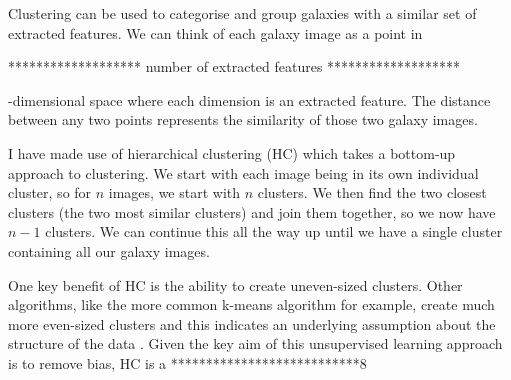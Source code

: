 \documentclass[12pt, onecolumn]{article}
\begin{document}
        Clustering can be used to categorise and group galaxies with a similar set of extracted features. We can think of each galaxy image as a point in 
        
        \vspace{5mm}
        ******************* number of extracted features *******************
        \vspace{5mm}
        
        -dimensional space where each dimension is an extracted feature. The distance between any two points represents the similarity of those two galaxy images.
        
        I have made use of hierarchical clustering (HC) which takes a bottom-up approach to clustering. We start with each image being in its own individual cluster, so for $n$ images, we start with $n$ clusters. We then find the two closest clusters (the two most similar clusters) and join them together, so we now have $n-1$ clusters. We can continue this all the way up until we have a single cluster containing all our galaxy images.

        One key benefit of HC is the ability to create uneven-sized clusters. Other algorithms, like the more common k-means algorithm for example, create much more even-sized clusters and this indicates an underlying assumption about the structure of the data \cite{hc_clustering_benefit}. Given the key aim of this unsupervised learning approach is to remove bias, HC is a ***************************8
    
        
        
\end{document}
